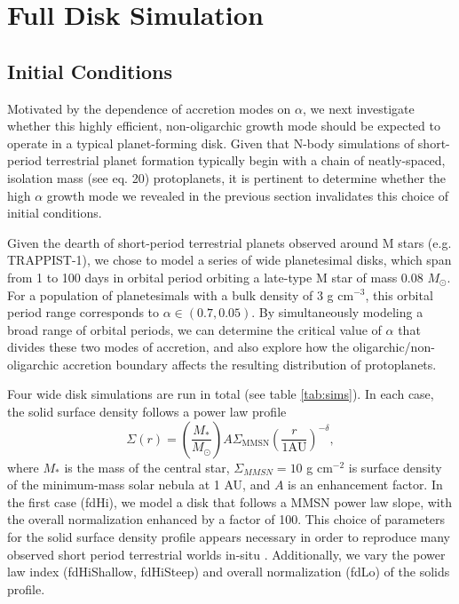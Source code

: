 \documentclass[twocolumn]{aastex63}
\begin{document}
\section{Full Disk Simulation}\label{sec:fulldisk}

\subsection{Initial Conditions}

Motivated by the dependence of accretion modes on $\alpha$,
we next investigate whether this highly efficient, non-oligarchic
growth mode should be expected to operate in a typical planet-forming
disk. Given that N-body simulations of short-period terrestrial planet formation 
typically begin with a chain of neatly-spaced, isolation mass 
(see \citet{kokubo00} eq. 20) protoplanets, it is pertinent to determine 
whether the high $\alpha$ growth mode we revealed
in the previous section invalidates this choice of initial conditions.

 Given the dearth of short-period terrestrial planets observed around M stars (e.g. TRAPPIST-1), we chose to model a series of wide planetesimal disks, which span from 1 to 100 days in orbital period orbiting a late-type M star of mass 0.08 $M_{\odot}$. For a population of planetesimals with a bulk density of 3 g cm$^{-3}$, this orbital period range corresponds to $\alpha \in (0.7, 0.05)$. By simultaneously modeling a broad range of orbital periods, we can determine the critical value of $\alpha$ that divides these two modes of accretion, and also explore how the oligarchic/non-oligarchic accretion boundary affects the resulting distribution of protoplanets.

Four wide disk simulations are run in total (see table \ref{tab:sims}). In each case, the solid surface density follows a power law profile
\begin{equation}
	\Sigma(r) = \left( \frac{M_{*}}{M_{\odot}} \right) A \Sigma_{\mathrm{MMSN}} \left( \frac{r}{1 \mathrm{AU}} \right)^{-\delta},
\end{equation}
where $M_{*}$ is the mass of the central star, $\Sigma_{MMSN} = 10$ g cm$^{-2}$ is surface density of the minimum-mass solar nebula \citep{hayashi81} at 1 AU, and $A$ is an enhancement factor. In the first case (fdHi), we model a disk that follows a MMSN power law slope, with the overall normalization enhanced by a factor of 100. This choice of parameters for the solid surface density profile appears necessary in order to reproduce many observed short period terrestrial worlds in-situ \citep{hansen12}. Additionally, we vary the power law index (fdHiShallow, fdHiSteep) and overall normalization (fdLo) of the solids profile.
\end{document}
